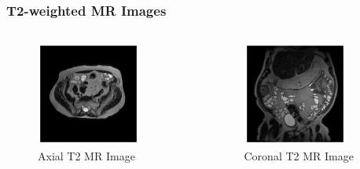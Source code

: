 \documentclass{beamer}
\begin{document}
\begin{frame}
	\frametitle{T2-weighted MR Images}
	\begin{columns}[c] %
		\begin{figure}[ht]
			\centering
			\includegraphics[width=0.8\textwidth]{../figures/axial.png}
			\caption{Axial T2 MR Image}
			\label{fig:axial-t2}
		\end{figure}
		
		\begin{figure}[ht]
			\centering
			\includegraphics[width=0.8\textwidth]{../figures/coronal.png}
			\caption{Coronal T2 MR Image}
			\label{fig:coronal-t2}
		\end{figure}
		
		\end{columns}
\end{frame}
\end{document}
